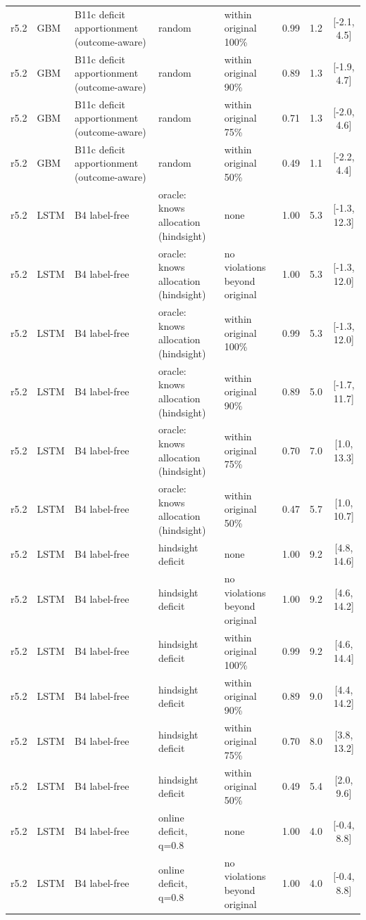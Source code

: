 \begin{longtable}{lllp{4.2cm}p{3.4cm}ccc}
r5.2 & GBM & B11c deficit apportionment (outcome-aware) & random & within original 100\% & 0.99 & 1.2 & [-2.1, 4.5] \\
r5.2 & GBM & B11c deficit apportionment (outcome-aware) & random & within original 90\% & 0.89 & 1.3 & [-1.9, 4.7] \\
r5.2 & GBM & B11c deficit apportionment (outcome-aware) & random & within original 75\% & 0.71 & 1.3 & [-2.0, 4.6] \\
r5.2 & GBM & B11c deficit apportionment (outcome-aware) & random & within original 50\% & 0.49 & 1.1 & [-2.2, 4.4] \\
r5.2 & LSTM & B4 label-free & oracle: knows allocation (hindsight) & none & 1.00 & 5.3 & [-1.3, 12.3] \\
r5.2 & LSTM & B4 label-free & oracle: knows allocation (hindsight) & no violations beyond original & 1.00 & 5.3 & [-1.3, 12.0] \\
r5.2 & LSTM & B4 label-free & oracle: knows allocation (hindsight) & within original 100\% & 0.99 & 5.3 & [-1.3, 12.0] \\
r5.2 & LSTM & B4 label-free & oracle: knows allocation (hindsight) & within original 90\% & 0.89 & 5.0 & [-1.7, 11.7] \\
r5.2 & LSTM & B4 label-free & oracle: knows allocation (hindsight) & within original 75\% & 0.70 & 7.0 & [1.0, 13.3] \\
r5.2 & LSTM & B4 label-free & oracle: knows allocation (hindsight) & within original 50\% & 0.47 & 5.7 & [1.0, 10.7] \\
r5.2 & LSTM & B4 label-free & hindsight deficit & none & 1.00 & 9.2 & [4.8, 14.6] \\
r5.2 & LSTM & B4 label-free & hindsight deficit & no violations beyond original & 1.00 & 9.2 & [4.6, 14.2] \\
r5.2 & LSTM & B4 label-free & hindsight deficit & within original 100\% & 0.99 & 9.2 & [4.6, 14.4] \\
r5.2 & LSTM & B4 label-free & hindsight deficit & within original 90\% & 0.89 & 9.0 & [4.4, 14.2] \\
r5.2 & LSTM & B4 label-free & hindsight deficit & within original 75\% & 0.70 & 8.0 & [3.8, 13.2] \\
r5.2 & LSTM & B4 label-free & hindsight deficit & within original 50\% & 0.49 & 5.4 & [2.0, 9.6] \\
r5.2 & LSTM & B4 label-free & online deficit, q=0.8 & none & 1.00 & 4.0 & [-0.4, 8.8] \\
r5.2 & LSTM & B4 label-free & online deficit, q=0.8 & no violations beyond original & 1.00 & 4.0 & [-0.4, 8.8] \\

\end{longtable}
